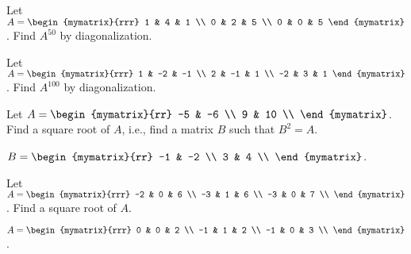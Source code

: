 \begin{enumialphparenastyle}
\begin{ex}
  Let $A = \begin{mymatrix}{rrr}
    1 & 4 & 1 \\
    0 & 2 & 5 \\
    0 & 0 & 5
  \end{mymatrix}$. Find $A^{50}$ by diagonalization.
\end{ex}

\begin{ex}
  Let $A = \begin{mymatrix}{rrr}
    1 & -2 & -1 \\
    2 & -1 & 1 \\
    -2 & 3 & 1
  \end{mymatrix}$. Find $A^{100}$ by diagonalization.
\end{ex}

\begin{ex}
  Let $A = \begin{mymatrix}{rr}
    -5 & -6 \\
    9 & 10 \\
  \end{mymatrix}$. Find a square root of $A$, i.e., find a matrix $B$
  such that $B^2=A$.
  \begin{sol}
    $B=\begin{mymatrix}{rr}
      -1 & -2 \\
      3  & 4 \\
  \end{mymatrix}$.
  \end{sol}
\end{ex}

\begin{ex}
  Let $A = \begin{mymatrix}{rrr}
    -2 & 0 & 6 \\
    -3 & 1 & 6 \\
    -3 & 0 & 7 \\
  \end{mymatrix}$. Find a square root of $A$.
  \begin{sol}
    $A = \begin{mymatrix}{rrr}
      0  &  0 & 2 \\
      -1 &  1 & 2 \\
      -1 &  0 & 3 \\
    \end{mymatrix}$.
  \end{sol}
\end{ex}

\end{enumialphparenastyle}

